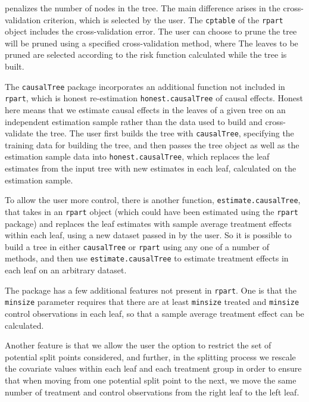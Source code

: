 \documentclass[11pt]{article}
\begin{document}
penalizes the number of nodes in the tree.  The main difference arises in the cross-validation criterion, which is 
selected by the user.  The \texttt{cptable} of the \texttt{rpart} object includes the cross-validation error.   The user can choose to prune the tree will be pruned using a specified cross-validation method, where  The leaves to be pruned are selected according to the risk function calculated while
the tree is built. \par
The \texttt{causalTree} package incorporates an additional function not included in \texttt{rpart}, which is honest re-estimation \texttt{honest.causalTree} of causal effects. Honest here means that we estimate causal effects in the leaves of a given tree on an independent estimation sample rather than the data used to build and cross-validate the tree.  The user first builds the tree
with \texttt{causalTree}, specifying the training data for building the tree, and then passes the tree object as well as the estimation sample data
into \texttt{honest.causalTree}, which replaces the leaf estimates from the input tree with new estimates in each leaf, calculated on the estimation sample.\par
To allow the user more control, there is another function, \texttt{estimate.causalTree}, that takes in an \texttt{rpart} object (which could have been estimated using the \texttt{rpart} package) and
replaces the leaf estimates with sample average treatment effects within each leaf, using a new dataset passed in by the user.  So it is possible to build a tree in either \texttt{causalTree}
or \texttt{rpart} using any one of a number of methods, and
then use \texttt{estimate.causalTree} to estimate treatment effects in each leaf on an arbitrary dataset. \par
The package has a few additional features not present in \texttt{rpart}.  One is that the \texttt{minsize} parameter requires that there are at least \texttt{minsize} treated and
\texttt{minsize} control observations in each leaf, so that a sample average treatment effect can be calculated. \par
Another feature is that we allow the user the option to restrict the set of potential split points considered,
and further, in the splitting process we rescale the covariate values within each leaf and each treatment group
in order to ensure that when moving
from one potential split point to the next, we move the same number of treatment and control observations from the right leaf to the left leaf.  \par
\end{document}
